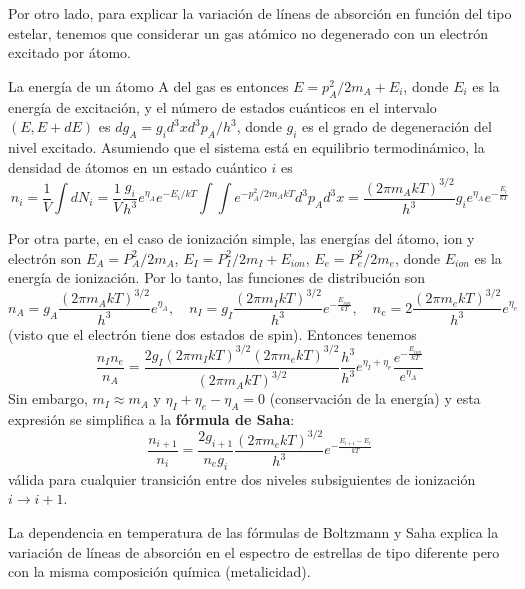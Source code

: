 \documentclass[11pt,letterpaper]{article}
\begin{document}
Por otro lado, para explicar la variación de líneas de absorción en función del tipo estelar, tenemos que considerar un gas atómico no degenerado con un electrón excitado por átomo.

La energía de un átomo A del gas es entonces \(E = p_A^2/2m_A + E_i\), donde \(E_i\) es la energía de excitación, y el número de estados cuánticos en el intervalo \((E, E+dE)\) es \(dg_A = g_i d^3x d^3p_A/h^3\), donde \(g_i\) es el grado de degeneración del nivel excitado. Asumiendo que el sistema está en equilibrio termodinámico, la densidad de átomos en un estado cuántico \(i\) es
\begin{equation}
    n_i = \frac{1}{V} \int dN_i = \frac{1}{V} \frac{g_i}{h^3} e^{\eta_A} e^{-E_i/kT} \int \int e^{-p_A^2/2m_A kT} d^3 p_A d^3 x = \frac{(2\pi m_A kT)^{3/2}}{h^3} g_i e^{\eta_A} e^{-\frac{E_i}{kT}}
\end{equation}

Por otra parte, en el caso de ionización simple, las energías del átomo, ion y electrón son \(E_A = P_A^2/2m_A\), \(E_I = P_I^2/2m_I + E_{ion}\), \(E_e = P_e^2/2m_e\), donde \(E_{ion}\) es la energía de ionización. Por lo tanto, las funciones de distribución son
\begin{equation}
    n_A = g_A \frac{(2\pi m_A kT)^{3/2}}{h^3} e^{\eta_A}, \quad n_I = g_I \frac{(2\pi m_I kT)^{3/2}}{h^3} e^{-\frac{E_{ion}}{kT}}, \quad n_e = 2 \frac{(2\pi m_e kT)^{3/2}}{h^3} e^{\eta_e}
\end{equation}
(visto que el electrón tiene dos estados de spin). Entonces tenemos
\begin{equation}
    \frac{n_I n_e}{n_A} = \frac{2 g_I (2\pi m_I kT)^{3/2} (2\pi m_e kT)^{3/2}}{(2\pi m_A kT)^{3/2}} \frac{h^3}{h^3} e^{\eta_I + \eta_e} \frac{e^{-\frac{E_{ion}}{kT}}}{e^{\eta_A}}
\end{equation}
Sin embargo, \(m_I \approx m_A\) y \(\eta_I + \eta_e - \eta_A = 0\) (conservación de la energía) y esta expresión se simplifica a la \textbf{fórmula de Saha}:
\begin{equation}
    \frac{n_{i+1}}{n_i} = \frac{2 g_{i+1}}{n_e g_i} \frac{(2\pi m_e kT)^{3/2}}{h^3} e^{-\frac{E_{i+1}-E_i}{kT}}
\end{equation}
válida para cualquier transición entre dos niveles subsiguientes de ionización \(i \to i+1\).

La dependencia en temperatura de las fórmulas de Boltzmann y Saha explica la variación de líneas de absorción en el espectro de estrellas de tipo diferente pero con la misma composición química (metalicidad).
\end{document}
